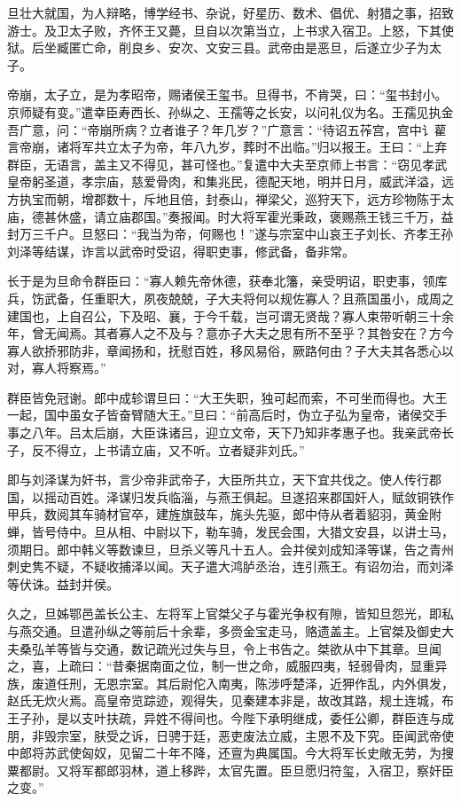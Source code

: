 \documentclass[12pt,UTF8]{ctexbook}
\begin{document}
旦壮大就国，为人辩略，博学经书、杂说，好星历、数术、倡优、射猎之事，招致游士。及卫太子败，齐怀王又薨，旦自以次第当立，上书求入宿卫。上怒，下其使狱。后坐臧匿亡命，削良乡、安次、文安三县。武帝由是恶旦，后遂立少子为太子。



帝崩，太子立，是为孝昭帝，赐诸侯王玺书。旦得书，不肯哭，曰：“玺书封小。京师疑有变。”遣幸臣寿西长、孙纵之、王孺等之长安，以问礼仪为名。王孺见执金吾广意，问：“帝崩所病？立者谁子？年几岁？”广意言：“待诏五莋宫，宫中讠雚言帝崩，诸将军共立太子为帝，年八九岁，葬时不出临。”归以报王。王曰：“上弃群臣，无语言，盖主又不得见，甚可怪也。”复遣中大夫至京师上书言：“窃见孝武皇帝躬圣道，孝宗庙，慈爱骨肉，和集兆民，德配天地，明并日月，威武洋溢，远方执宝而朝，增郡数十，斥地且倍，封泰山，禅梁父，巡狩天下，远方珍物陈于太庙，德甚休盛，请立庙郡国。”奏报闻。时大将军霍光秉政，褒赐燕王钱三千万，益封万三千户。旦怒曰：“我当为帝，何赐也！”遂与宗室中山哀王子刘长、齐孝王孙刘泽等结谋，诈言以武帝时受诏，得职吏事，修武备，备非常。



长于是为旦命令群臣曰：“寡人赖先帝休德，获奉北籓，亲受明诏，职吏事，领库兵，饬武备，任重职大，夙夜兢兢，子大夫将何以规佐寡人？且燕国虽小，成周之建国也，上自召公，下及昭、襄，于今千载，岂可谓无贤哉？寡人束带听朝三十余年，曾无闻焉。其者寡人之不及与？意亦子大夫之思有所不至乎？其咎安在？方今寡人欲挢邪防非，章闻扬和，抚慰百姓，移风易俗，厥路何由？子大夫其各悉心以对，寡人将察焉。”



群臣皆免冠谢。郎中成轸谓旦曰：“大王失职，独可起而索，不可坐而得也。大王一起，国中虽女子皆奋臂随大王。”旦曰：“前高后时，伪立子弘为皇帝，诸侯交手事之八年。吕太后崩，大臣诛诸吕，迎立文帝，天下乃知非孝惠子也。我亲武帝长子，反不得立，上书请立庙，又不听。立者疑非刘氏。”



即与刘泽谋为奸书，言少帝非武帝子，大臣所共立，天下宜共伐之。使人传行郡国，以摇动百姓。泽谋归发兵临淄，与燕王俱起。旦遂招来郡国奸人，赋敛铜铁作甲兵，数阅其车骑材官卒，建旌旗鼓车，旄头先驱，郎中侍从者着貂羽，黄金附蝉，皆号侍中。旦从相、中尉以下，勒车骑，发民会围，大猎文安县，以讲士马，须期日。郎中韩义等数谏旦，旦杀义等凡十五人。会并侯刘成知泽等谋，告之青州刺史隽不疑，不疑收捕泽以闻。天子遣大鸿胪丞治，连引燕王。有诏勿治，而刘泽等伏诛。益封并侯。



久之，旦姊鄂邑盖长公主、左将军上官桀父子与霍光争权有隙，皆知旦怨光，即私与燕交通。旦遣孙纵之等前后十余辈，多赍金宝走马，赂遗盖主。上官桀及御史大夫桑弘羊等皆与交通，数记疏光过失与旦，令上书告之。桀欲从中下其章。旦闻之，喜，上疏曰：“昔秦据南面之位，制一世之命，威服四夷，轻弱骨肉，显重异族，废道任刑，无恩宗室。其后尉佗入南夷，陈涉呼楚泽，近狎作乱，内外俱发，赵氏无炊火焉。高皇帝览踪迹，观得失，见秦建本非是，故改其路，规土连城，布王子孙，是以支叶扶疏，异姓不得间也。今陛下承明继成，委任公卿，群臣连与成朋，非毁宗室，肤受之诉，日骋于廷，恶吏废法立威，主恩不及下究。臣闻武帝使中郎将苏武使匈奴，见留二十年不降，还亶为典属国。今大将军长史敞无劳，为搜粟都尉。又将军都郎羽林，道上移跸，太官先置。臣旦愿归符玺，入宿卫，察奸臣之变。”
\end{document}

